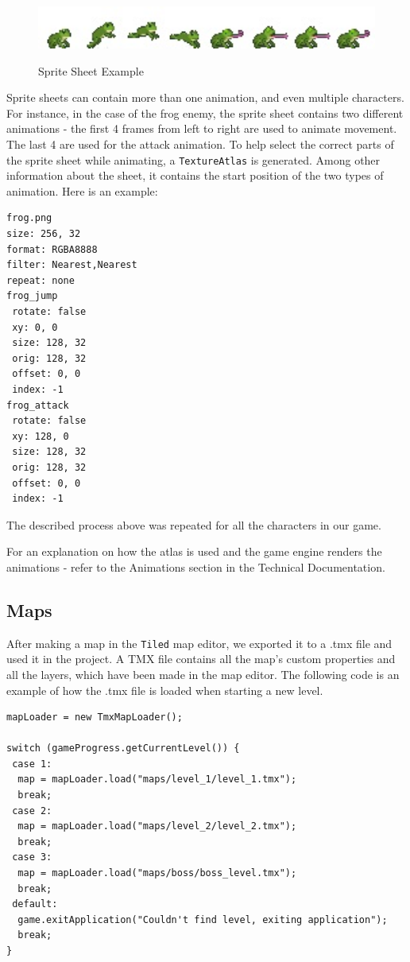 \documentclass[12p]{article}
\begin{document}
\begin{figure}[ht]
 \center
 \includegraphics[width=1\textwidth]{Documentation/frog.jpg}
 \label{SpriteSheetExample}
 \caption{Sprite Sheet Example}
\end{figure}

Sprite sheets can contain more than one animation, and even multiple characters. For instance, in the case of the frog enemy, the sprite sheet contains two different animations - the first 4 frames from left to right are used to animate movement. The last 4 are used for the attack animation. To help select the correct parts of the sprite sheet while animating, a \texttt{TextureAtlas} is generated. Among other information about the sheet, it contains the start position of the two types of animation. Here is an example:

\begin{verbatim}
frog.png
size: 256, 32
format: RGBA8888
filter: Nearest,Nearest
repeat: none
frog_jump
 rotate: false
 xy: 0, 0
 size: 128, 32
 orig: 128, 32
 offset: 0, 0
 index: -1
frog_attack
 rotate: false
 xy: 128, 0
 size: 128, 32
 orig: 128, 32
 offset: 0, 0
 index: -1
\end{verbatim}

The described process above was repeated for all the characters in our game. 

For an explanation on how the atlas is used and the game engine renders the animations - refer to the Animations section in the Technical Documentation.


\newpage
\subsection{Maps} \label{DocMaps}

After making a map in the \texttt{Tiled} map editor, we exported it to a .tmx file and used it in the project. A TMX file contains all the map’s custom properties and all the layers, which have been made in the map editor. The following code is an example of how the .tmx file is loaded when starting a new level.

\begin{verbatim}
mapLoader = new TmxMapLoader();

switch (gameProgress.getCurrentLevel()) {
 case 1:
  map = mapLoader.load("maps/level_1/level_1.tmx");
  break;
 case 2:
  map = mapLoader.load("maps/level_2/level_2.tmx");
  break;
 case 3:
  map = mapLoader.load("maps/boss/boss_level.tmx");
  break;
 default:
  game.exitApplication("Couldn't find level, exiting application");
  break;
}
\end{verbatim}
\end{document}
